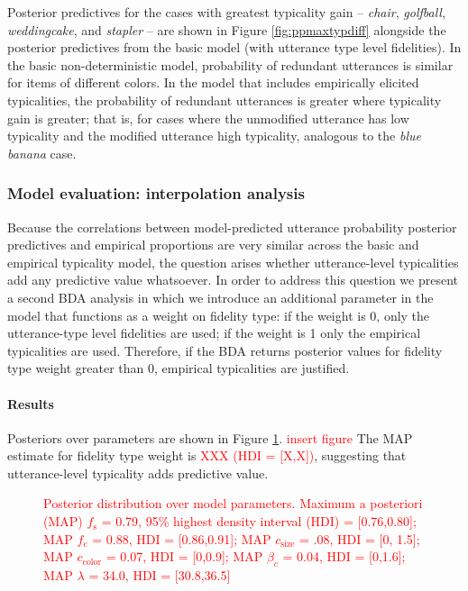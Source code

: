 \documentclass[11pt]{article}
\newcommand{\red}[1]{\textcolor{Red}{#1}}
\newcommand{\figref}[1]{Figure \ref{#1}}
\begin{document}
Posterior predictives for the cases with greatest typicality gain -- \emph{chair}, \emph{golfball}, \emph{weddingcake}, and \emph{stapler} -- are shown in \figref{fig:ppmaxtypdiff} alongside the posterior predictives from the basic model (with utterance type level fidelities). In the basic non-deterministic model, probability of redundant utterances is similar for items of different colors. In the model that includes empirically elicited typicalities, the probability of redundant utterances is greater where typicality gain is greater; that is, for cases where the unmodified utterance has low typicality and the modified utterance high typicality, analogous to the \emph{blue banana} case.

\subsubsection{Model evaluation: interpolation analysis}

Because the correlations between model-predicted utterance probability posterior predictives and empirical proportions are very similar across the basic and empirical typicality model, the question arises whether utterance-level typicalities add any predictive value whatsoever. In order to address this question we present a second BDA analysis in which we introduce an additional parameter in the model that functions as a weight on fidelity type: if the weight is 0, only the utterance-type level fidelities are used; if the weight is 1 only the empirical typicalities are used. Therefore, if the BDA returns posterior values for fidelity type weight greater than 0, empirical typicalities are justified.

\paragraph{Results} Posteriors over parameters are shown in \figref{fig:interpolposteriors}. \red{insert figure} The MAP estimate for fidelity type weight is \red{XXX (HDI = [X,X])}, suggesting that utterance-level typicality adds predictive value.

\begin{figure}
\label{fig:interpolposteriors}
\caption{\red{Posterior distribution over model parameters. Maximum a posteriori (MAP)  $f_{\textrm{s}}$ = 0.79, 95\% highest density interval (HDI) = [0.76,0.80]; MAP $f_{\textrm{c}}$ = 0.88, HDI = [0.86,0.91]; MAP $c_{\textrm{size}}$ = .08, HDI = [0, 1.5]; MAP $c_{\textrm{color}}$ = 0.07, HDI = [0,0.9]; MAP $\beta_c$ = 0.04, HDI = [0,1.6]; MAP $\lambda$ = 34.0, HDI = [30.8,36.5]}}
\end{figure}
\end{document}
